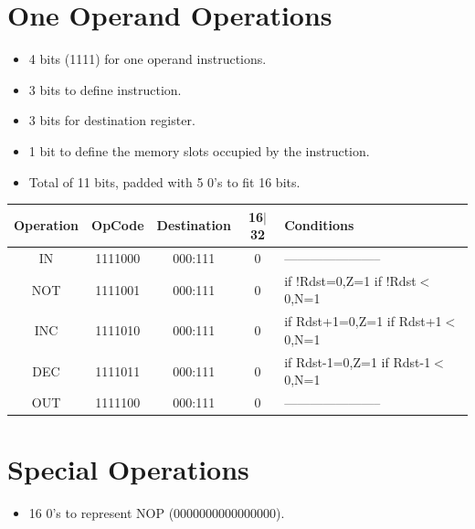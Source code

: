 \documentclass[12pt]{report}
\begin{document}
\section{One Operand Operations}
\begin{itemize}
    \item 4 bits (1111) for one operand instructions.
    \item 3 bits to define instruction.
    \item 3 bits for destination register.
    \item 1 bit to define the memory slots occupied by the instruction.
    \item Total of 11 bits, padded with 5 0's to fit 16 bits.
\end{itemize}
\begin{center}
 \begin{tabular}{||c| c| c| c| p{40mm}||} 
 \hline
 Operation & OpCode & Destination & 16$|$32 & Conditions  \\ [0.5ex] 
 \hline\hline
 IN & 1111000 & 000:111 & 0 & ----------------------- \\
 \hline
 NOT & 1111001 & 000:111 & 0 & if !Rdst=0,Z=1 \newline if !Rdst$<$0,N=1 \\
 \hline
 INC & 1111010 & 000:111 & 0 & if Rdst+1=0,Z=1 \newline if Rdst+1$<$0,N=1 \\
 \hline
 DEC & 1111011 & 000:111 & 0 & if Rdst-1=0,Z=1 \newline if Rdst-1$<$0,N=1 \\
 \hline
 OUT & 1111100 & 000:111 & 0 & ----------------------- \\
 \hline
\end{tabular}
\end{center}

\section{Special Operations}
\begin{itemize}
    \item 16 0's to represent NOP (0000000000000000).
\end{itemize}
\end{document}
